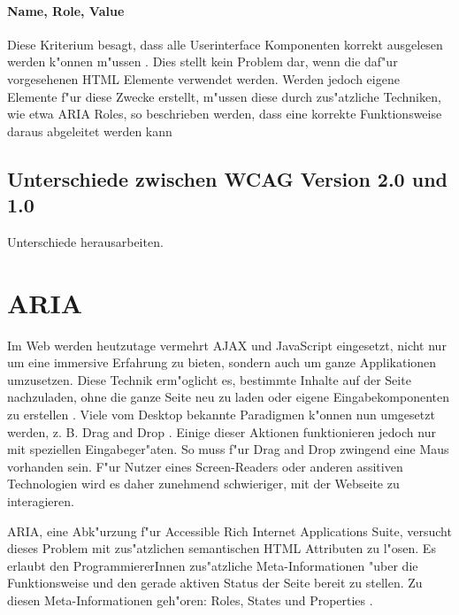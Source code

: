 \documentclass[a4paper,bibtotoc,oneside]{scrbook}
\begin{document}
\subsubsection{Name, Role, Value}
Diese Kriterium besagt, dass alle Userinterface Komponenten korrekt ausgelesen werden k"onnen m"ussen \cite[Abschnitt 4.1.2]{wcag2}. Dies stellt kein Problem dar, wenn die daf"ur vorgesehenen HTML Elemente verwendet werden. Werden jedoch eigene Elemente f"ur diese Zwecke erstellt, m"ussen diese durch zus"atzliche Techniken, wie etwa ARIA Roles, so beschrieben werden, dass eine korrekte Funktionsweise daraus abgeleitet werden kann \cite[Abschnitt Intent of this Success Criterion]{understand_412}

\section{Unterschiede zwischen WCAG Version 2.0 und 1.0}
Unterschiede herausarbeiten.


\chapter{ARIA}
Im Web werden heutzutage vermehrt AJAX und JavaScript eingesetzt, nicht nur um eine immersive Erfahrung zu bieten, sondern auch um ganze Applikationen umzusetzen. Diese Technik erm"oglicht es, bestimmte Inhalte auf der Seite nachzuladen, ohne die ganze Seite neu zu laden oder eigene Eingabekomponenten zu erstellen \cite[S.26]{mod_software}. Viele vom Desktop bekannte Paradigmen k"onnen nun umgesetzt werden, z. B. \glqq Drag and Drop \grqq. Einige dieser Aktionen funktionieren jedoch nur mit speziellen Eingabeger"aten. So muss f"ur Drag and Drop zwingend eine Maus vorhanden sein. F"ur Nutzer eines Screen-Readers oder anderen assitiven Technologien wird es daher zunehmend schwieriger, mit der Webseite zu interagieren. \cite{aria_intro}

ARIA, eine Abk"urzung f"ur Accessible Rich Internet Applications Suite, versucht dieses Problem mit zus"atzlichen semantischen HTML Attributen zu l"osen. Es erlaubt den ProgrammiererInnen zus"atzliche Meta-Informationen "uber die Funktionsweise und den gerade aktiven Status der Seite bereit zu stellen. Zu diesen Meta-Informationen geh"oren: Roles, States und Properties \cite{aria_intro}. 
\end{document}
